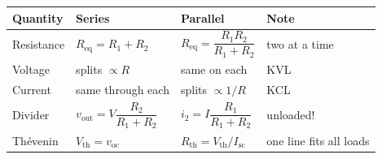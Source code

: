 \begin{tabular}{@{}llll@{}}
\toprule
Quantity & Series & Parallel & Note \\
\midrule
Resistance & $R_{\mathrm{eq}}=R_1+R_2$ & $R_{\mathrm{eq}}=\dfrac{R_1R_2}{R_1+R_2}$ & two at a time \\
Voltage & splits $\propto R$ & same on each & KVL \\
Current & same through each & splits $\propto 1/R$ & KCL \\
Divider & $v_{\mathrm{out}}=V\dfrac{R_2}{R_1+R_2}$ & $i_2=I\dfrac{R_1}{R_1+R_2}$ & unloaded! \\
Th\'evenin & $V_{\mathrm{th}}=v_{\mathrm{oc}}$ & $R_{\mathrm{th}}=V_{\mathrm{th}}/I_{\mathrm{sc}}$ & one line fits all loads \\
\bottomrule
\end{tabular}
